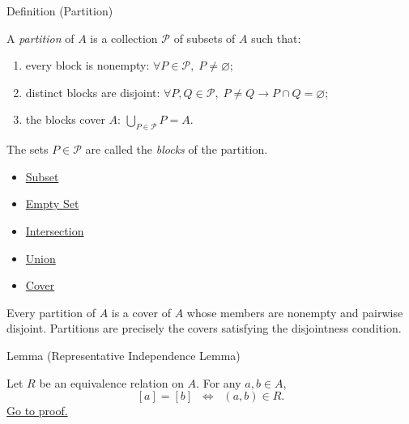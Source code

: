 \begin{definitionbox}{Definition (Partition)}
\begin{definition}[Partition]\label{def:partition}
A \emph{partition} of $A$ is a collection $\mathcal{P}$ of subsets of $A$ such
that:
\begin{enumerate}[label=(\roman*)]
\item every block is nonempty: $\forall P \in \mathcal{P},\; P \neq \varnothing$;
\item distinct blocks are disjoint:
$\forall P,Q \in \mathcal{P},\; P \neq Q \rightarrow P \cap Q = \varnothing$;
\item the blocks cover $A$: $\bigcup_{P \in \mathcal{P}} P = A$.
\end{enumerate}
The sets $P \in \mathcal{P}$ are called the \emph{blocks} of the partition.
\end{definition}
\end{definitionbox}

\begin{dependencies}
\begin{itemize}
  \item \hyperref[def:subset]{Subset}
  \item \hyperref[def:empty-set]{Empty Set}
  \item \hyperref[def:intersection]{Intersection}
  \item \hyperref[def:union]{Union}
  \item \hyperref[def:cover-full]{Cover}
\end{itemize}
\end{dependencies}

\begin{remark*}
Every partition of $A$ is a cover of $A$ whose members are nonempty and
pairwise disjoint. Partitions are precisely the covers satisfying the
disjointness condition.
\end{remark*}


\begin{lemmabox}{Lemma (Representative Independence Lemma)}
\begin{lemma}\label{lem:rep-independence}
Let $R$ be an equivalence relation on $A$. For any $a,b \in A$,
\[
[a] = [b]
\;\;\Longleftrightarrow\;\;
(a,b) \in R.
\]
\hyperref[prf:rep-independence]{Go to proof.}
\end{lemma}
\end{lemmabox}

